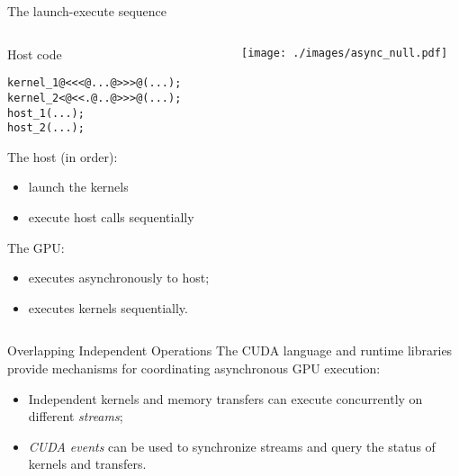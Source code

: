 \documentclass[aspectratio=43]{beamer}
\begin{document}
\begin{frame}[fragile]{The launch-execute sequence}
    \begin{columns}[T]
        \begin{column}{0.5\textwidth}
            \begin{codecolumn}{Host code}
                \begin{lstlisting}[style=boxcudatiny]
kernel_1@<<<@...@>>>@(...);
kernel_2<@<<.@..@>>>@(...);
host_1(...);
host_2(...);
                \end{lstlisting}
            \end{codecolumn}
                The host (in order):
                \begin{itemize}
                    \item launch the kernels
                    \item execute host calls sequentially
                \end{itemize}
                The GPU:
                \begin{itemize}
                    \item executes asynchronously to host;
                    \item executes kernels sequentially.
                \end{itemize}
        \end{column}
        \begin{column}{0.5\textwidth}
            \texttt{[image: ./images/async\_null.pdf]}
        \end{column}
    \end{columns}
\end{frame}

\begin{frame}[fragile]{Overlapping Independent Operations}
    The CUDA language and runtime libraries provide mechanisms for coordinating asynchronous GPU execution:

    \begin{itemize}
        \item Independent kernels and memory transfers can execute concurrently on different \emph{streams};
        \item \emph{CUDA events} can be used to synchronize streams and query the status of kernels and transfers.
    \end{itemize}

\end{frame}
\end{document}
